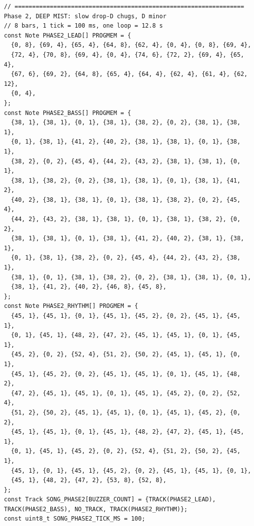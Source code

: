 \documentclass[11pt,a4paper]{article}
\begin{document}
\begin{lstlisting}[language=Arduino]
// ================================================================= Phase 2, DEEP MIST: slow drop-D chugs, D minor
// 8 bars, 1 tick = 100 ms, one loop = 12.8 s
const Note PHASE2_LEAD[] PROGMEM = {
  {0, 8}, {69, 4}, {65, 4}, {64, 8}, {62, 4}, {0, 4}, {0, 8}, {69, 4},
  {72, 4}, {70, 8}, {69, 4}, {0, 4}, {74, 6}, {72, 2}, {69, 4}, {65, 4},
  {67, 6}, {69, 2}, {64, 8}, {65, 4}, {64, 4}, {62, 4}, {61, 4}, {62, 12},
  {0, 4},
};
const Note PHASE2_BASS[] PROGMEM = {
  {38, 1}, {38, 1}, {0, 1}, {38, 1}, {38, 2}, {0, 2}, {38, 1}, {38, 1},
  {0, 1}, {38, 1}, {41, 2}, {40, 2}, {38, 1}, {38, 1}, {0, 1}, {38, 1},
  {38, 2}, {0, 2}, {45, 4}, {44, 2}, {43, 2}, {38, 1}, {38, 1}, {0, 1},
  {38, 1}, {38, 2}, {0, 2}, {38, 1}, {38, 1}, {0, 1}, {38, 1}, {41, 2},
  {40, 2}, {38, 1}, {38, 1}, {0, 1}, {38, 1}, {38, 2}, {0, 2}, {45, 4},
  {44, 2}, {43, 2}, {38, 1}, {38, 1}, {0, 1}, {38, 1}, {38, 2}, {0, 2},
  {38, 1}, {38, 1}, {0, 1}, {38, 1}, {41, 2}, {40, 2}, {38, 1}, {38, 1},
  {0, 1}, {38, 1}, {38, 2}, {0, 2}, {45, 4}, {44, 2}, {43, 2}, {38, 1},
  {38, 1}, {0, 1}, {38, 1}, {38, 2}, {0, 2}, {38, 1}, {38, 1}, {0, 1},
  {38, 1}, {41, 2}, {40, 2}, {46, 8}, {45, 8},
};
const Note PHASE2_RHYTHM[] PROGMEM = {
  {45, 1}, {45, 1}, {0, 1}, {45, 1}, {45, 2}, {0, 2}, {45, 1}, {45, 1},
  {0, 1}, {45, 1}, {48, 2}, {47, 2}, {45, 1}, {45, 1}, {0, 1}, {45, 1},
  {45, 2}, {0, 2}, {52, 4}, {51, 2}, {50, 2}, {45, 1}, {45, 1}, {0, 1},
  {45, 1}, {45, 2}, {0, 2}, {45, 1}, {45, 1}, {0, 1}, {45, 1}, {48, 2},
  {47, 2}, {45, 1}, {45, 1}, {0, 1}, {45, 1}, {45, 2}, {0, 2}, {52, 4},
  {51, 2}, {50, 2}, {45, 1}, {45, 1}, {0, 1}, {45, 1}, {45, 2}, {0, 2},
  {45, 1}, {45, 1}, {0, 1}, {45, 1}, {48, 2}, {47, 2}, {45, 1}, {45, 1},
  {0, 1}, {45, 1}, {45, 2}, {0, 2}, {52, 4}, {51, 2}, {50, 2}, {45, 1},
  {45, 1}, {0, 1}, {45, 1}, {45, 2}, {0, 2}, {45, 1}, {45, 1}, {0, 1},
  {45, 1}, {48, 2}, {47, 2}, {53, 8}, {52, 8},
};
const Track SONG_PHASE2[BUZZER_COUNT] = {TRACK(PHASE2_LEAD), TRACK(PHASE2_BASS), NO_TRACK, TRACK(PHASE2_RHYTHM)};
const uint8_t SONG_PHASE2_TICK_MS = 100;


\end{lstlisting}
\end{document}
